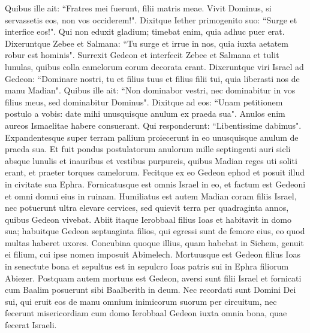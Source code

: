 \begin{biblechapter}
\verse Quibus ille ait: “Fratres mei fuerunt, filii matris meae. Vivit Dominus, si servassetis eos, non vos occiderem!". 
\verse Dixitque Iether primogenito suo: “Surge et interfice eos!". Qui non eduxit gladium; timebat enim, quia adhuc puer erat. 
\verse Dixeruntque Zebee et Salmana: “Tu surge et irrue in nos, quia iuxta aetatem robur est hominis". Surrexit Gedeon et interfecit Zebee et Salmana et tulit lunulas, quibus colla camelorum eorum decorata erant. 
\verse Dixeruntque viri Israel ad Gedeon: “Dominare nostri, tu et filius tuus et filius filii tui, quia liberasti nos de manu Madian". 
\verse Quibus ille ait: “Non dominabor vestri, nec dominabitur in vos filius meus, sed dominabitur Dominus". 
\verse Dixitque ad eos: “Unam petitionem postulo a vobis: date mihi unusquisque anulum ex praeda sua". Anulos enim aureos Ismaelitae habere consuerant. 
\verse Qui responderunt: “Libentissime dabimus". Expandentesque super terram pallium proiecerunt in eo unusquisque anulum de praeda sua. 
\verse Et fuit pondus postulatorum anulorum mille septingenti auri sicli absque lunulis et inauribus et vestibus purpureis, quibus Madian reges uti soliti erant, et praeter torques camelorum. 
\verse Fecitque ex eo Gedeon ephod et posuit illud in civitate sua Ephra. Fornicatusque est omnis Israel in eo, et factum est Gedeoni et omni domui eius in ruinam. 
\verse Humiliatus est autem Madian coram filiis Israel, nec potuerunt ultra elevare cervices, sed quievit terra per quadraginta annos, quibus Gedeon vivebat. 
\verse Abiit itaque Ierobbaal filius Ioas et habitavit in domo sua; 
\verse habuitque Gedeon septuaginta filios, qui egressi sunt de femore eius, eo quod multas haberet uxores. 
\verse Concubina quoque illius, quam habebat in Sichem, genuit ei filium, cui ipse nomen imposuit Abimelech. 
\verse Mortuusque est Gedeon filius Ioas in senectute bona et sepultus est in sepulcro Ioas patris sui in Ephra filiorum Abiezer. 
\verse Postquam autem mortuus est Gedeon, aversi sunt filii Israel et fornicati cum Baalim posuerunt sibi Baalberith in deum. 
\verse Nec recordati sunt Domini Dei sui, qui eruit eos de manu omnium inimicorum suorum per circuitum, 
\verse nec fecerunt misericordiam cum domo Ierobbaal Gedeon iuxta omnia bona, quae fecerat Israeli. 
\end{biblechapter}

